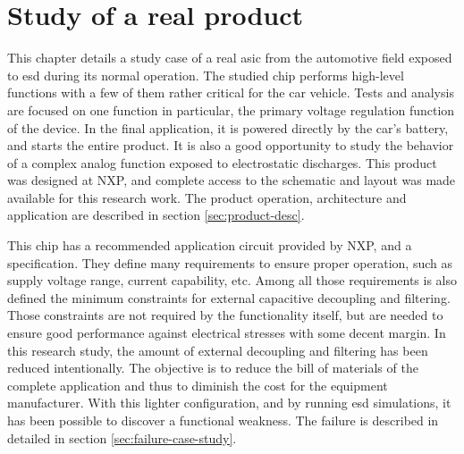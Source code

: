 \section{Study of a real product}
\label{sec:study-real-product}

This chapter details a study case of a real \gls{asic} from the automotive field exposed to \gls{esd} during its normal operation.
The studied chip performs high-level functions with a few of them rather critical for the car vehicle.
Tests and analysis are focused on one function in particular, the primary voltage regulation function of the device.
In the final application, it is powered directly by the car's battery, and starts the entire product.
It is also a good opportunity to study the behavior of a complex analog function exposed to electrostatic discharges.
This product was designed at NXP, and complete access to the schematic and layout was made available for this research work.
The product operation, architecture and application are described in section \ref{sec:product-desc}.

This chip has a recommended application circuit provided by NXP, and a specification.
They define many requirements to ensure proper operation, such as supply voltage range, current capability, etc.
Among all those requirements is also defined the minimum constraints for external capacitive decoupling and filtering.
Those constraints are not required by the functionality itself, but are needed to ensure good performance against electrical stresses with some decent margin.
In this research study, the amount of external decoupling and filtering has been reduced intentionally.
The objective is to reduce the bill of materials of the complete application and thus to diminish the cost for the equipment manufacturer.
With this lighter configuration, and by running \gls{esd} simulations, it has been possible to discover a functional weakness.
The failure is described in detailed in section \ref{sec:failure-case-study}.



